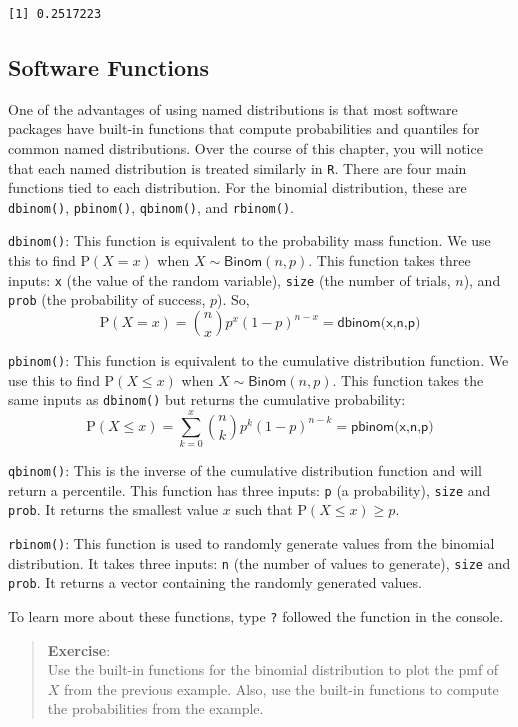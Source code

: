 \documentclass[
  letterpaper,
  DIV=11,
  numbers=noendperiod]{scrreprt}
\begin{document}
\begin{verbatim}
[1] 0.2517223
\end{verbatim}

\subsection{Software Functions}\label{software-functions}

One of the advantages of using named distributions is that most software
packages have built-in functions that compute probabilities and
quantiles for common named distributions. Over the course of this
chapter, you will notice that each named distribution is treated
similarly in \texttt{R}. There are four main functions tied to each
distribution. For the binomial distribution, these are
\texttt{dbinom()}, \texttt{pbinom()}, \texttt{qbinom()}, and
\texttt{rbinom()}.

\texttt{dbinom()}: This function is equivalent to the probability mass
function. We use this to find \(\mbox{P}(X=x)\) when
\(X\sim \textsf{Binom}(n,p)\). This function takes three inputs:
\texttt{x} (the value of the random variable), \texttt{size} (the number
of trials, \(n\)), and \texttt{prob} (the probability of success,
\(p\)). So, \[
\mbox{P}(X=x)={n\choose{x}}p^x(1-p)^{n-x}=\textsf{dbinom(x,n,p)}
\]

\texttt{pbinom()}: This function is equivalent to the cumulative
distribution function. We use this to find \(\mbox{P}(X\leq x)\) when
\(X\sim \textsf{Binom}(n,p)\). This function takes the same inputs as
\texttt{dbinom()} but returns the cumulative probability: \[
\mbox{P}(X\leq x)=\sum_{k=0}^x{n\choose{k}}p^k(1-p)^{n-k}=\textsf{pbinom(x,n,p)}
\]

\texttt{qbinom()}: This is the inverse of the cumulative distribution
function and will return a percentile. This function has three inputs:
\texttt{p} (a probability), \texttt{size} and \texttt{prob}. It returns
the smallest value \(x\) such that \(\mbox{P}(X\leq x) \geq p\).

\texttt{rbinom()}: This function is used to randomly generate values
from the binomial distribution. It takes three inputs: \texttt{n} (the
number of values to generate), \texttt{size} and \texttt{prob}. It
returns a vector containing the randomly generated values.

To learn more about these functions, type \texttt{?} followed the
function in the console.

\begin{quote}
\textbf{Exercise}:\\
Use the built-in functions for the binomial distribution to plot the pmf
of \(X\) from the previous example. Also, use the built-in functions to
compute the probabilities from the example.
\end{quote}
\end{document}
